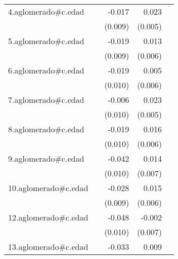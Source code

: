 {\begin{longtable}{l*{4}{D{.}{.}{-1}}}
\addlinespace
4.aglomerado#c.edad&                     &      -0.017         &       0.023\sym{***}&                     \\
            &                     &     (0.009)         &     (0.005)         &                     \\
\addlinespace
5.aglomerado#c.edad&                     &      -0.019\sym{*}  &       0.013\sym{*}  &                     \\
            &                     &     (0.009)         &     (0.006)         &                     \\
\addlinespace
6.aglomerado#c.edad&                     &      -0.019         &       0.005         &                     \\
            &                     &     (0.010)         &     (0.006)         &                     \\
\addlinespace
7.aglomerado#c.edad&                     &      -0.006         &       0.023\sym{***}&                     \\
            &                     &     (0.010)         &     (0.005)         &                     \\
\addlinespace
8.aglomerado#c.edad&                     &      -0.019         &       0.016\sym{**} &                     \\
            &                     &     (0.010)         &     (0.006)         &                     \\
\addlinespace
9.aglomerado#c.edad&                     &      -0.042\sym{***}&       0.014\sym{*}  &                     \\
            &                     &     (0.010)         &     (0.007)         &                     \\
\addlinespace
10.aglomerado#c.edad&                     &      -0.028\sym{**} &       0.015\sym{**} &                     \\
            &                     &     (0.009)         &     (0.006)         &                     \\
\addlinespace
12.aglomerado#c.edad&                     &      -0.048\sym{***}&      -0.002         &                     \\
            &                     &     (0.010)         &     (0.007)         &                     \\
\addlinespace
13.aglomerado#c.edad&                     &      -0.033\sym{***}&       0.009         &                     \\

\end{longtable}}
